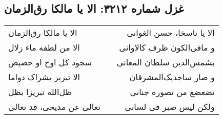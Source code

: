\begin{center}
\section*{غزل شماره ۳۲۱۲: الا یا مالکا رق‌الزمان}
\label{sec:3212}
\begin{longtable}{l p{0.5cm} r}
الا یا مالکا رق‌الزمان
&&
الا یا ناسخا، حسن الغوانی
\\
الا من لطفه ماء زلال
&&
و مافی‌الکون ظرف کالاوانی
\\
سجود کل اوج او حضیض
&&
بشمس‌الدین سلطان المعانی
\\
الا تبریز بشراک دواما
&&
و صار ساجدیک‌المشرقان
\\
ظل‌الله تبریزا بظل
&&
تضعضع من تصوره جنانی
\\
تعالی عن مدیحی، قد تعالی
&&
ولکن لیس صبر فی لسانی
\\
\end{longtable}
\end{center}
